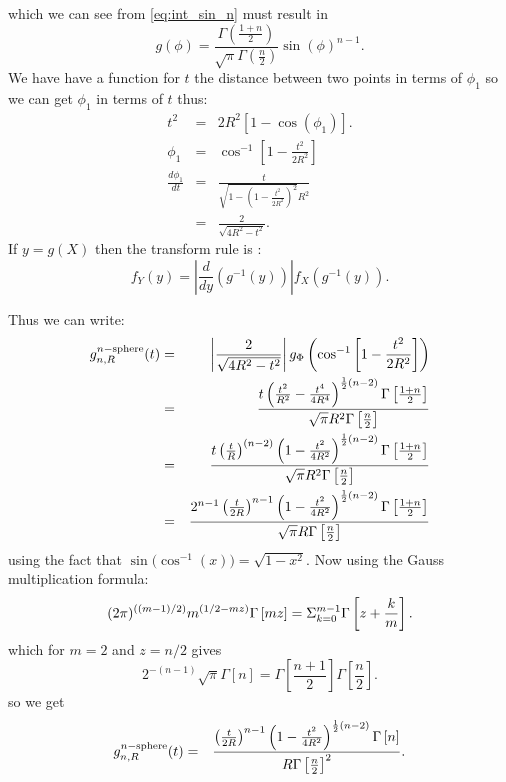 which we can see from \eqref{eq:int_sin_n} must result in
\begin{equation}  
 g(\phi) = \frac{\Gamma\left(\frac{1+n}{2}\right)}
                  {\sqrt{\pi } \Gamma\left(\frac{n}{2}\right)} 
                      \sin(\phi )^{n - 1}.
\end{equation} 
We have have a function for $t$ the distance between two points in
terms of $\phi_1$ so we can get  $\phi_1$ in terms of $t$ thus: 
\begin{eqnarray}
  t^2 & = & 2 R^2 \left[ 1 - \cos(\phi_1) \right].\\
\phi_1& =  & \cos^{-1} \left[1-\frac{t^2}{2 R^2}\right]\\ 
   \frac {d \phi_1}{dt} & = &\frac{t}{\sqrt{1-\left(1-\frac{t^2}{2 R^2}\right)^2} R^2} \\
   & = &\frac{2}{\sqrt{4 R^2 -t^2 }}.
\end{eqnarray}
If $y = g(X)$ then the transform rule  is :  
\[ f_Y(y) = \left| \frac{d}{dy} \left( g^{-1}(y) \right) \right|
                f_X\left( g^{-1}(y) \right).
\]

Thus we can write:
\begin{eqnarray}
  g^{n-{\rm sphere}}_{n,R}(t)
    & = & \left|\frac{2}{\sqrt{4 R^2 -t^2 }} \right|
             g_{\Phi}\left( \cos^{-1} \left[1-\frac{t^2}{2  R^2}\right]\right) \nonumber \\
    & = & \frac{t \left(\frac{t^2}{R^2} -\frac{t^4}{4 R^4}\right)^{\frac{1}{2} (n-2)}
             \Gamma\left[\frac{1+n}{2}\right]}{\sqrt{\pi } R^2 \Gamma\left[\frac{n}{2}\right]}  \nonumber \\
    & = & \frac{t \left(\frac{t}{R} \right)^{(n-2)}
             \left(1 -\frac{t^2}{4 R^2}\right)^{\frac{1}{2} (n-2)}
             \Gamma\left[\frac{1+n}{2}\right]}{\sqrt{\pi } R^2 \Gamma\left[\frac{n}{2}\right]}  \nonumber \\
    & = & \frac{2^{n-1} \left(\frac{t}{2R} \right)^{n-1}
             \left(1 -\frac{t^2}{4 R^2}\right)^{\frac{1}{2} (n-2)}
             \Gamma\left[\frac{1+n}{2}\right]}{\sqrt{\pi } R \Gamma\left[\frac{n}{2}\right]}  
\end{eqnarray}
using the fact that $\sin\big( \cos^{-1}(x) \big) = \sqrt{1 - x^2}$.
Now using the Gauss multiplication formula: 
\begin{equation}
(2\pi)^{((m-1)/2)}m^{(1/2-mz)} \Gamma\left[mz\right]=\Sigma_{k=0}^{m-1}\Gamma\left[z+\frac{k}{m}\right].  \nonumber \\ 
\end{equation}
which for $m = 2$ and $z = n/2$ gives
\begin{equation}
 2^{-(n-1)}\sqrt{ \pi } \Gamma\left[n\right]=\Gamma\left[\frac{n+1}{2}\right] \Gamma\left[\frac{n}{2}\right].  
  \label{eq:gamma_rel}
\end{equation}
so we get
\begin{eqnarray}
  g^{n-{\rm sphere}}_{n,R}(t)
    & = & \frac{\left(\frac{t}{2R} \right)^{n-1}
             \left(1 -\frac{t^2}{4 R^2}\right)^{\frac{1}{2} (n-2)}\Gamma\left[n\right]}
             { R \Gamma\left[\frac{n}{2}\right]^2}.
  \label{eq:nsphere_pdf_phi}
\end{eqnarray}


